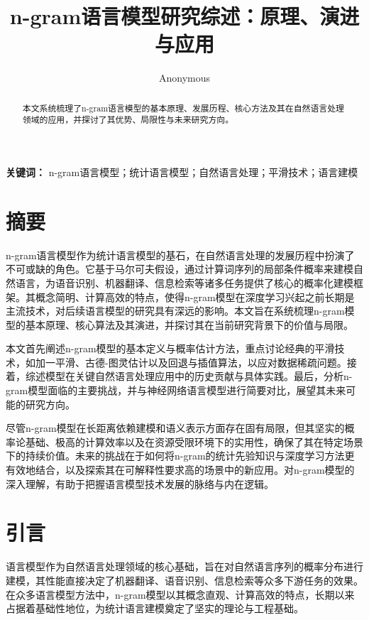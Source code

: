 \documentclass[10pt,a4paper,twocolumn]{article}
\title{ n-gram语言模型研究综述：原理、演进与应用 }
\author{ Anonymous }
\date{}
\begin{document}
\maketitle

\begin{abstract}
本文系统梳理了n-gram语言模型的基本原理、发展历程、核心方法及其在自然语言处理领域的应用，并探讨了其优势、局限性与未来研究方向。
\end{abstract}


\noindent\textbf{关键词：} n-gram语言模型；统计语言模型；自然语言处理；平滑技术；语言建模



\section{ 摘要 }
n-gram语言模型作为统计语言模型的基石，在自然语言处理的发展历程中扮演了不可或缺的角色。它基于马尔可夫假设，通过计算词序列的局部条件概率来建模自然语言，为语音识别、机器翻译、信息检索等诸多任务提供了核心的概率化建模框架\cite{anonndchen1996empirical}。其概念简明、计算高效的特点，使得n-gram模型在深度学习兴起之前长期是主流技术，对后续语言模型的研究具有深远的影响\cite{anonndjurafsky2000speech}。本文旨在系统梳理n-gram模型的基本原理、核心算法及其演进，并探讨其在当前研究背景下的价值与局限。

本文首先阐述n-gram模型的基本定义与概率估计方法，重点讨论经典的平滑技术，如加一平滑、古德-图灵估计以及回退与插值算法，以应对数据稀疏问题\cite{anonndgood1953population}。接着，综述模型在关键自然语言处理应用中的历史贡献与具体实践。最后，分析n-gram模型面临的主要挑战，并与神经网络语言模型进行简要对比，展望其未来可能的研究方向。

尽管n-gram模型在长距离依赖建模和语义表示方面存在固有局限，但其坚实的概率论基础、极高的计算效率以及在资源受限环境下的实用性，确保了其在特定场景下的持续价值。未来的挑战在于如何将n-gram的统计先验知识与深度学习方法更有效地结合，以及探索其在可解释性要求高的场景中的新应用\cite{anonndbengio2003neural}。对n-gram模型的深入理解，有助于把握语言模型技术发展的脉络与内在逻辑。


\section{ 引言 }
语言模型作为自然语言处理领域的核心基础，旨在对自然语言序列的概率分布进行建模，其性能直接决定了机器翻译、语音识别、信息检索等众多下游任务的效果\cite{anonndjelinek_ngram}。在众多语言模型方法中，n-gram模型以其概念直观、计算高效的特点，长期以来占据着基础性地位，为统计语言建模奠定了坚实的理论与工程基础。
\end{document}
